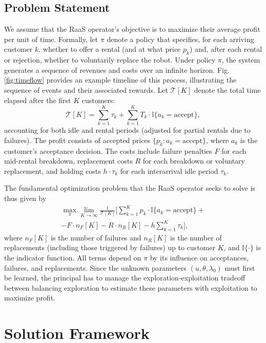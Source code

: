 \documentclass[letterpaper, 10 pt, conference]{IEEEconf}
\begin{document}
\subsection{Problem Statement}
We assume that the RaaS operator's objective is to maximize their average profit per unit of time. Formally, let $\pi$ denote a policy that specifies, for each arriving customer $k$, whether to offer a rental (and at what price $p_k$) and, after each rental or rejection, whether to voluntarily replace the robot. Under policy $\pi$, the system generates a sequence of revenues and costs over an infinite horizon. Fig. \ref{fig:timeflow} provides an example timeline of this process, illustrating the sequence of events and their associated rewards.  Let $\mathcal{T}[K]$ denote the total time elapsed after the first $K$ customers:
\begin{equation}
\textstyle\mathcal{T}[K] = \sum_{k=1}^K \tau_k + \sum_{k=1}^K T_k \cdot \mathbb{I}\{a_k = \text{accept}\},
\end{equation}
accounting for both idle and rental periods (adjusted for partial rentals due to failures). The profit consists of accepted prices $\{p_k : a_k = \text{accept}\}$, where $a_k$ is the customer's acceptance decision. The costs include failure penalties $F$ for each mid-rental breakdown, replacement costs $R$ for each breakdown or voluntary replacement, and holding costs $h \cdot \tau_k$ for each interarrival idle period $\tau_k$.


The fundamental optimization problem that the RaaS operator seeks to solve is thus given by
\begin{multline}
\label{eqn:raasobj}
\textstyle    \max_{\pi} \lim_{K \to \infty} \frac{1}{\mathcal{T}[K]} \big[ \sum_{k=1}^K p_k \cdot \mathbb{I}\{a_k = \text{accept}\} +\\
   \textstyle - F \cdot n_F[K] - R \cdot n_R[K] - h \sum_{k=1}^K \tau_k \big],
\end{multline}
where $n_F[K]$ is the number of failures and $n_R[K]$ is the number of replacements (including those triggered by failures) up to customer $K$, and $\mathbb{I}\{\cdot\}$ is the indicator function. All terms depend on $\pi$ by its influence on acceptances, failures, and replacements. Since the unknown parameters $(u, \theta, \lambda_0)$ must first be learned, the principal has to manage the exploration-exploitation tradeoff between balancing exploration to estimate these parameters with exploitation to maximize profit.

\section{Solution Framework}
\label{sec:sf}
\end{document}
